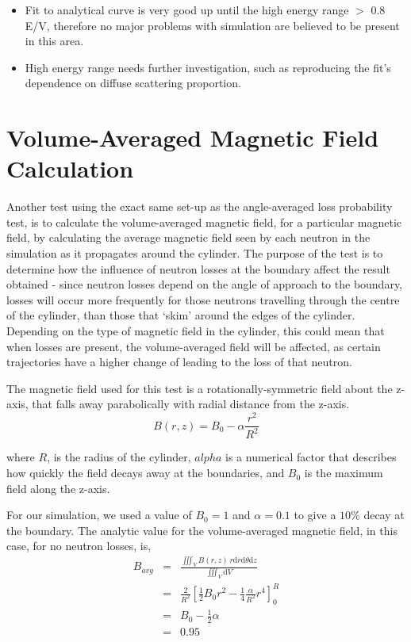 \documentclass[11pt,a4paper,oneside]{article}
\begin{document}
\begin{itemize}
\item  Fit to analytical curve is very good up until the high energy range $>$ 0.8 E/V, therefore no major problems with simulation are believed to be present in this area.
\item  High energy range needs further investigation, such as reproducing the fit's dependence on diffuse scattering proportion. 
\end{itemize}


\section{Volume-Averaged Magnetic Field Calculation}

Another test using the exact same set-up as the angle-averaged loss probability test, is to calculate the volume-averaged magnetic field, for a particular magnetic field, by calculating the average magnetic field seen by each neutron in the simulation as it propagates around the cylinder. The purpose of the test is to determine how the influence of neutron losses at the boundary affect the result obtained - since neutron losses depend on the angle of approach to the boundary, losses will occur more frequently for those neutrons travelling through the centre of the cylinder, than those that `skim' around the edges of the cylinder. Depending on the type of magnetic field in the cylinder, this could mean that when losses are present, the volume-averaged field will be affected, as certain trajectories have a higher change of leading to the loss of that neutron. 

The magnetic field used for this test is a rotationally-symmetric field about the z-axis, that falls away parabolically with radial distance from the z-axis.
\begin{equation}
B(r,z) = B_{0} - \alpha \frac{r^{2}}{R^{2}} 
\label{eqn:magfield}
\end{equation}

where $R$, is the radius of the cylinder, $alpha$ is a numerical factor that describes how quickly the field decays away at the boundaries, and $B_{0}$ is the maximum field along the z-axis.

For our simulation, we used a value of $B_{0} = 1$ and $\alpha = 0.1$ to give a $10\%$ decay at the boundary. The analytic value for the volume-averaged magnetic field, in this case, for no neutron losses, is,
\begin{eqnarray*}
B_{avg} &=& \frac{\iiint_{V} B(r,z) \, r\mathrm{d}r\mathrm{d}\theta \mathrm{d}z }{\iiint_{V}\mathrm{d}V} \\
 &=& \frac{2}{R^{2}} \left[ \frac{1}{2}B_{0}r^{2} - \frac{1}{4}\frac{\alpha}{R^{2}}r^{4}  \right]^{R}_{0} \\
 &=& B_{0} - \frac{1}{2}\alpha \\
 &=& 0.95
\end{eqnarray*}
\end{document}

